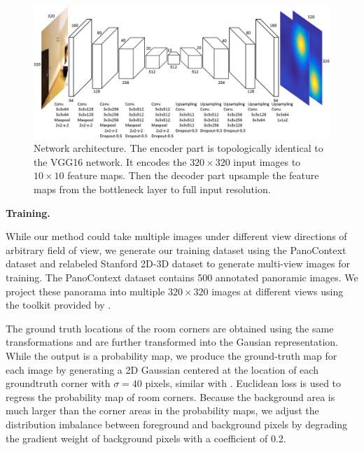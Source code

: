 \begin{figure}
	\centering
	\includegraphics[width=\linewidth]{figs/network.png}
	\caption{Network architecture. The encoder part is topologically identical to the VGG16 network. It encodes the $320 \times 320$ input images to $10 \times 10$ feature maps. Then the decoder part upsample the feature maps from the bottleneck layer to full input resolution. }
	\label{fig:network}
\end{figure}

\noindent\textbf{Training.} 


While our method could take multiple images under different view directions of arbitrary field of view, we generate our training dataset using the PanoContext dataset \cite{zhang2014panocontext} and relabeled Stanford 2D-3D dataset \cite{layoutnet} to generate multi-view images for training. 
The PanoContext dataset contains 500 annotated panoramic images. We project these panorama into multiple $320 \times 320$ images at different views using the toolkit provided by \cite{zhang2014panocontext}. 

The ground truth locations of the room corners are obtained using the same transformations and are further transformed into the Gausian representation. 
While the output is a probability map, we produce the ground-truth map for each image by generating a 2D Gaussian centered at the location of each groundtruth corner with $\sigma=40$ pixels, similar with \cite{LeeRoomNet17,tompson2014joint,pfister2015flowing}.
%
Euclidean loss is used to regress the probability map of room corners. 
Because the background area is much larger than the corner areas in the probability maps, we adjust the distribution imbalance between foreground and background pixels by degrading the gradient weight of background pixels with a coefficient of 0.2.


